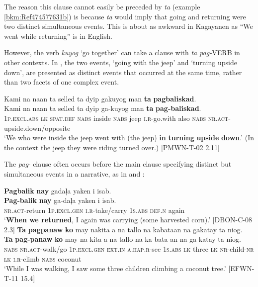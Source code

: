 The reason this clause cannot easily be preceded by \textit{ta} (example \ref{bkm:Ref474577631b}) is because \textit{ta} would imply that going and returning were two distinct simultaneous events. This is about as awkward in Kagayanen as “We went while returning” is in English.

However, the verb \textit{kuyog} ‘go together’ can take a clause with \textit{ta pag-}VERB in other contexts. In , the two events, ‘going with the jeep’ and ‘turning upside down’, are presented as distinct events that occurred at the same time, rather than two facets of one complex event.

\ea
\label{bkm:Ref115166079}
Kami  na  naan  ta  selled  ta  dyip  gakuyog man  \textbf{ta}  \textbf{pagbaliskad}.  \smallskip\\
\gll Kami  na  naan  ta  selled  ta  dyip  ga-kuyog man  \textbf{ta}  \textbf{pag-baliskad}.  \\
1\textsc{p.excl.abs}  \textsc{lk}  \textsc{spat.def}  \textsc{nabs}  inside  \textsc{nabs}  jeep  \textsc{i.r}-go.with
also  \textsc{nabs}  \textsc{nr.act}-upside.down/opposite \\
\glt `We who were inside the jeep went with (the jeep) \textbf{in} \textbf{turning} \textbf{upside} \textbf{down}.’ (In the context the jeep they were riding turned over.) [PMWN-T-02 2.11]
\z

The \textit{pag}{}- clause often occurs before the main clause specifying distinct but simultaneous events in a narrative, as in  and :

\ea
\label{bkm:Ref478135574}
\textbf{Pagbalik}  \textbf{nay}  gadaļa  yaken  i  isab. \smallskip\\
\gll \textbf{Pag-balik}  \textbf{nay}  ga-daļa  yaken  i  isab. \\
\textsc{nr.act}-return  1\textsc{p.excl.gen}  \textsc{i.r}-take/carry  1\textsc{s.abs}  \textsc{def.n}  again \\
\glt ‘\textbf{When we returned}, I again was carrying (some harvested corn).’ [DBON-C-08 2.3]
\z
\ea
\label{ex:acoconuttree}
\textbf{Ta}  \textbf{pagpanaw}  \textbf{ko}  may  nakita  a  na  tallo na  kabataan  na  gakatay  ta  niog. \smallskip\\
\gll \textbf{Ta}  \textbf{pag-panaw}  \textbf{ko}  may  na-kita  a  na  tallo na  ka-bata-an  na  ga-katay  ta  niog. \\
\textsc{nabs}  \textsc{nr.act}-walk/go  1\textsc{p.excl.gen}  \textsc{ext.in}  \textsc{a.hap.r}-see  1\textsc{s.abs}  \textsc{lk}  three
\textsc{lk}  \textsc{nr}-child-\textsc{nr}  \textsc{lk}  \textsc{i.r}-climb  \textsc{nabs}  coconut \\
\glt `While I was walking, I saw some three children climbing a coconut tree.’ [EFWN-T-11 15.4]
\z


